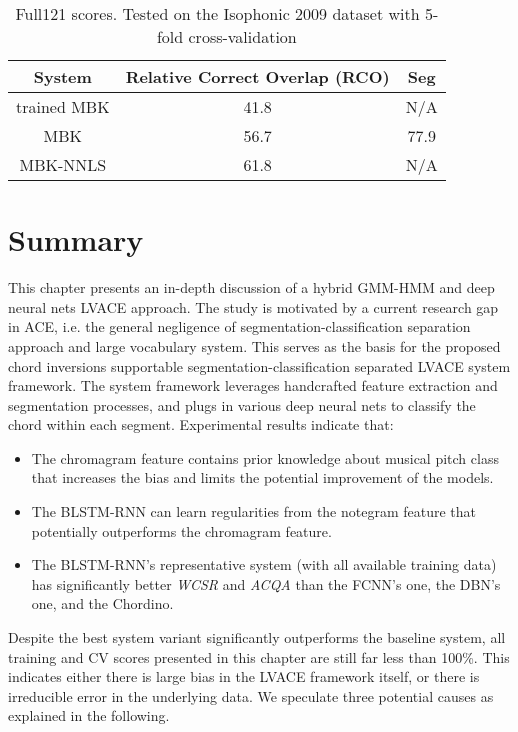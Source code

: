 \begin{table}[h]
\footnotesize
\centering
\begin{tabular}{|c|c|c|}\hline
System & Relative Correct Overlap (RCO) & Seg \\ \hline
trained MBK & 41.8 & N/A \\ \hline
MBK & 56.7 & 77.9 \\ \hline
MBK-NNLS & 61.8 & N/A \\ \hline
\end{tabular}
\caption{Full121 scores. Tested on the Isophonic 2009 dataset with 5-fold cross-validation \cite{mauch2010automatic}}
\label{tab:3-fullmbk}
\end{table}


\section{Summary} \label{sec:3-concln}
This chapter presents an in-depth discussion of a hybrid GMM-HMM and deep neural nets LVACE approach. The study is motivated by a current research gap in ACE, i.e. the general negligence of segmentation-classification separation approach and large vocabulary system. This serves as the basis for the proposed chord inversions supportable segmentation-classification separated LVACE system framework. The system framework leverages handcrafted feature extraction and segmentation processes, and plugs in various deep neural nets to classify the chord within each segment. Experimental results indicate that:
\begin{itemize}
	\item The chromagram feature contains prior knowledge about musical pitch class that increases the bias and limits the potential improvement of the models.
	\item The BLSTM-RNN can learn regularities from the notegram feature that potentially outperforms the chromagram feature.
	\item The BLSTM-RNN's representative system (with all available training data) has significantly better \textit{WCSR} and \textit{ACQA} than the FCNN's one, the DBN's one, and the Chordino.
\end{itemize}

Despite the best system variant significantly outperforms the baseline system, all training and CV scores presented in this chapter are still far less than 100\%. This indicates either there is large bias in the LVACE framework itself, or there is irreducible error in the underlying data. We speculate three potential causes as explained in the following.

